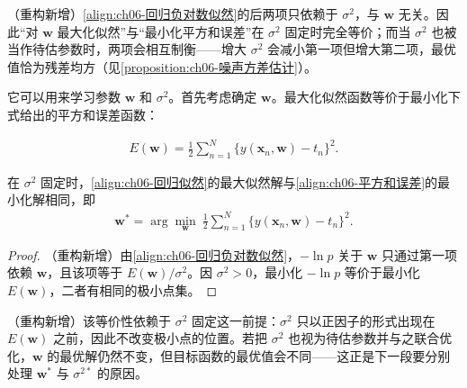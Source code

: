 \documentclass[../../main.tex]{subfiles}
\begin{document}
\begin{remark}（重构新增）\eqref{align:ch06-回归负对数似然}的后两项只依赖于 $\sigma^{2}$，与 $\boldsymbol{w}$ 无关。因此“对 $\boldsymbol{w}$ 最大化似然”与“最小化平方和误差”在 $\sigma^{2}$ 固定时完全等价；而当 $\sigma^{2}$ 也被当作待估参数时，两项会相互制衡——增大 $\sigma^{2}$ 会减小第一项但增大第二项，最优值恰为残差均方（见\cref{proposition:ch06-噪声方差估计}）。
\end{remark}

它可以用来学习参数 $\boldsymbol{w}$ 和 $\sigma^{2}$。首先考虑确定 $\boldsymbol{w}$。最大化似然函数等价于最小化下式给出的平方和误差函数：

\begin{align}
E(\boldsymbol{w})=\frac{1}{2}\sum_{n=1}^{N}\bigl\{y(\boldsymbol{x}_n,\boldsymbol{w})-t_n\bigr\}^{2}.
\label{align:ch06-平方和误差}
\end{align}

\begin{proposition}[最大似然等价于最小平方和]\label{proposition:ch06-平方和误差}
在 $\sigma^{2}$ 固定时，\eqref{align:ch06-回归似然}的最大似然解与\eqref{align:ch06-平方和误差}的最小化解相同，即
\begin{align}
\boldsymbol{w}^{\ast}=\arg\min_{\boldsymbol{w}}\ \frac{1}{2}\sum_{n=1}^{N}\bigl\{y(\boldsymbol{x}_n,\boldsymbol{w})-t_n\bigr\}^{2}.
\label{align:ch06-最大似然解}
\end{align}
\end{proposition}

\begin{proof}
（重构新增）由\eqref{align:ch06-回归负对数似然}，$-\ln p$ 关于 $\boldsymbol{w}$ 只通过第一项依赖 $\boldsymbol{w}$，且该项等于 $E(\boldsymbol{w})/\sigma^{2}$。因 $\sigma^{2}>0$，最小化 $-\ln p$ 等价于最小化 $E(\boldsymbol{w})$，二者有相同的极小点集。
\end{proof}

\begin{remark}（重构新增）该等价性依赖于 $\sigma^{2}$ 固定这一前提：$\sigma^{2}$ 只以正因子的形式出现在 $E(\boldsymbol{w})$ 之前，因此不改变极小点的位置。若把 $\sigma^{2}$ 也视为待估参数并与之联合优化，$\boldsymbol{w}$ 的最优解仍然不变，但目标函数的最优值会不同——这正是下一段要分别处理 $\boldsymbol{w}^{\ast}$ 与 $\sigma^{2\ast}$ 的原因。
\end{remark}
\end{document}
